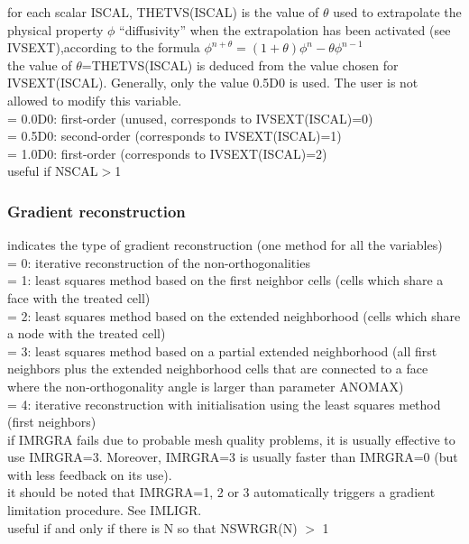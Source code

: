 {for each scalar ISCAL, THETVS(ISCAL) is the value of $\theta$ used to
extrapolate the physical property $\phi$ ``diffusivity'' when the extrapolation has
been activated (see IVSEXT),according to the
formula $\phi^{n+\theta}=(1+\theta)\phi^n-\theta \phi^{n-1}$\\
the value of $\theta$=THETVS(ISCAL) is deduced from the value chosen for
IVSEXT(ISCAL). Generally, only the value 0.5D0 is used. The user is not
allowed to modify this variable.\\
\hspace*{1.3cm}= 0.0D0: first-order (unused, corresponds to
IVSEXT(ISCAL)=0)\\
\hspace*{1.3cm}= 0.5D0: second-order (corresponds to IVSEXT(ISCAL)=1) \\
\hspace*{1.3cm}= 1.0D0: first-order (corresponds to IVSEXT(ISCAL)=2) \\
useful if NSCAL$>$1}


\subsubsection{Gradient reconstruction}

{indicates the type of gradient reconstruction (one method for all the
variables)\\
\hspace*{1.3cm}= 0: iterative reconstruction of the non-orthogonalities\\
\hspace*{1.3cm}= 1: least squares method based on the first neighbor cells
(cells which share a face with the treated cell)\\
\hspace*{1.3cm}= 2: least squares method based on the extended neighborhood
(cells which share a node with the treated cell)\\
\hspace*{1.3cm}= 3: least squares method based on a partial extended
neighborhood (all first neighbors plus the extended neighborhood cells that
are connected to a face where the non-orthogonality angle is larger than
parameter ANOMAX)\\
\hspace*{1.3cm}= 4: iterative reconstruction with initialisation using the least
squares method (first neighbors)\\
if IMRGRA fails due to probable mesh quality problems, it is usually effective
to use IMRGRA=3. Moreover, IMRGRA=3 is usually faster than IMRGRA=0 (but with
less feedback on its use).\\
it should be noted that IMRGRA=1, 2 or 3 automatically triggers a gradient
limitation procedure. See IMLIGR.\\
useful if and only if there is N so that NSWRGR(N) $>$ 1}

